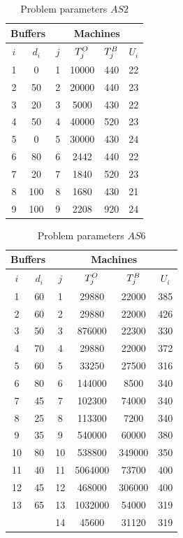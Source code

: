 \documentclass{ifacconf}
\begin{document}
\begin{table}[h!]
	\centering
	\small
	\begin{tabular}{||c|c||c|c|c|c||}
		\hline
		\multicolumn{2}{||c||}{Buffers}&\multicolumn{4}{|c||}{Machines}\\
		\hline
		$i$ & $d_i$ & $j$  & $T^{\rm O}_j$ & $T^{\rm B}_j$ & $U_i$ \\
		\hline
		1 & 0   & 1  & 10000 & 440 & 22 \\
		2 & 50  & 2  & 20000 & 440 & 23 \\
		3 & 20  & 3  & 5000  & 430 & 22 \\
		4 & 50  & 4  & 40000 & 520 & 23 \\
		5 &  0  & 5  & 30000 & 430 & 24 \\
		6 & 80  & 6  & 2442  & 440 & 22 \\
		7 & 20  & 7  & 1840  & 520 & 23 \\
		8 & 100 & 8  & 1680  & 430 & 21 \\
		9 & 100 & 9  & 2208  & 920 & 24 \\
		\hline
	\end{tabular}
	\caption{Problem parameters $\textit{AS2}$} \label{tabl:as2}
\end{table}  
\begin{table}[h!]
	\centering
	\small
	\begin{tabular}{||c|c||c|c|c|c||}
		\hline 
		\multicolumn{2}{||c||}{Buffers}&\multicolumn{4}{|c||}{Machines}\\
		\hline
		$i$ & $d_i$ & $j$  & $T^{\rm O}_j$ & $T^{\rm B}_j$ & $U_i$ \\
		\hline
		1  & 60 & 1 & 29880 & 22000 &  385\\
		2  & 60 & 2 & 29880 & 22000 & 426\\
		3  & 50 & 3 & 876000 & 22300 & 330 \\
		4  & 70 & 4 & 29880 & 22000 & 372\\
		5  & 60 & 5 & 33250 & 27500 & 316 \\
		6  & 80 & 6 & 144000 & 8500 & 340 \\
		7  & 45 & 7 & 102300 & 74000 & 340 \\
		8  & 25 & 8 & 113300 & 7200 & 340 \\
		9  & 35 & 9 & 540000 &  60000 & 380 \\
		10 & 80 & 10 & 538800 & 349000 & 350 \\
		11 & 40 & 11 & 5064000 & 73700 & 400 \\
		12 & 45 & 12 & 468000 & 306000 & 400 \\
		13 & 65 & 13 & 1032000 & 54000 & 319 \\
		& & 14 & 45600 & 31120 & 319 \\
		\hline
	\end{tabular}
	\caption{Problem parameters $\textit{AS6}$} \label{tabl:as6}
\end{table}  
\end{document}
